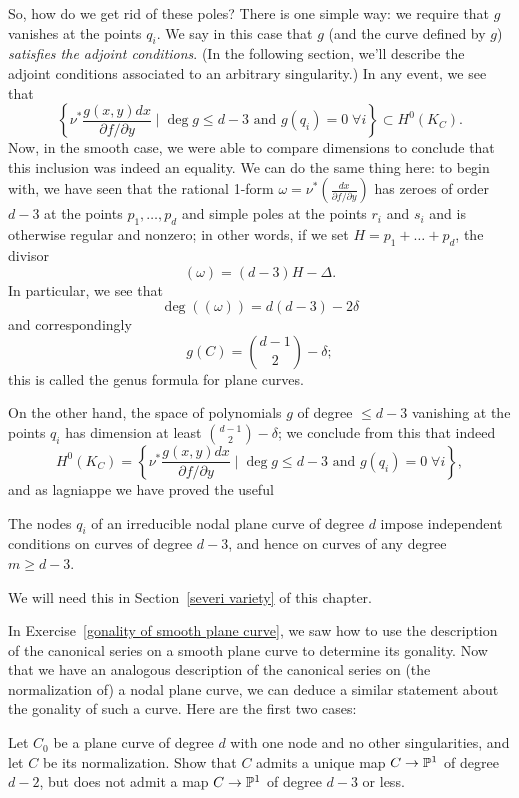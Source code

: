 So, how do we get rid of these poles? There is one simple way: we require that $g$ vanishes at the points $q_i$. We say in this case that $g$ (and the curve defined by $g$) \emph{satisfies the adjoint conditions}. (In the following section, we'll describe the adjoint conditions associated to an arbitrary singularity.) In any event, we see that
$$
 \left\{ \nu^* \frac{g(x,y)dx}{\partial f/\partial y} \mid \deg g \leq d-3 \text{ and } g(q_i) = 0 \; \forall i \right\} \subset H^0(K_C).
$$
Now, in the smooth case, we were able to compare dimensions to conclude that this inclusion was indeed an equality. We can do the same thing here: to begin with, we have seen that the  rational 1-form $\omega = \nu^*(\frac{dx}{\partial f/\partial y})$ has zeroes of order $d-3$ at the points $p_1,\dots,p_d$ and simple poles at the points $r_i$ and $s_i$ and is otherwise regular and nonzero; in other words, if we set $H = p_1+\dots + p_d$, the divisor
$$
(\omega) = (d-3)H - \Delta.
$$
In particular, we see that
$$
\deg((\omega)) = d(d-3) - 2\delta
$$
and correspondingly
$$
g(C) = \binom{d-1}{2} - \delta;
$$
this is called the genus formula for plane curves.

On the other hand, the space of polynomials $g$ of degree $\leq d-3$ vanishing at the points $q_i$ has dimension at least $ \binom{d-1}{2} - \delta$; we conclude from this that indeed
$$
H^0(K_C) =  \left\{ \nu^* \frac{g(x,y)dx}{\partial f/\partial y} \mid \deg g \leq d-3 \text{ and } g(q_i) = 0 \; \forall i \right\},
$$
and as lagniappe we have proved the useful

\begin{lemma}\label{adjoint independent}
The nodes $q_i$ of an irreducible nodal plane curve of degree $d$ impose independent conditions on curves of degree $d-3$, and hence on curves of any degree $m \geq d-3$.
\end{lemma}

We will need this in Section~\ref{severi variety} of this chapter.

In Exercise~\ref{gonality of smooth plane curve}, we saw how to use the description of the canonical series on a smooth plane curve to determine its gonality. Now that we have an analogous description of the canonical series on (the normalization of) a nodal plane curve, we can deduce a similar statement about the gonality of such a curve. Here are the first two cases: 
\begin{exercise}
Let $C_0$ be a plane curve of degree $d$ with one node and no other singularities, and let $C$ be its normalization. Show that $C$ admits a unique map $C \to {\mathbb P}^1$ of degree $d-2$, but does not admit a map $C \to {\mathbb P}^1$ of degree $d-3$ or less.
\end{exercise}

